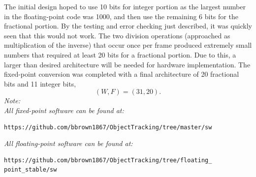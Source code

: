 \documentclass[12pt]{article} %
\begin{document}
The initial design hoped to use 10 bits for integer portion as the largest number in the floating-point code was 1000, and then use the remaining 6 bits for the fractional portion. By the testing and error checking just described, it was quickly seen that this would not work. The two division operations (approached as multiplication of the inverse) that occur once per frame produced extremely small numbers that required at least 20 bits for a fractional portion. Due to this, a larger than desired architecture will be needed for hardware implementation. The fixed-point conversion was completed with a final architecture of 20 fractional bits and 11 integer bits, 
\[
(W,F) = (31,20).
\]
\textit{Note: }\\
\textit{All fixed-point software can be found at: }
\begin{verbatim}
https://github.com/bbrown1867/ObjectTracking/tree/master/sw
\end{verbatim}
\textit{All floating-point software can be found at:} 
\begin{verbatim} 
https://github.com/bbrown1867/ObjectTracking/tree/floating_
point_stable/sw
\end{verbatim}
\end{document}
